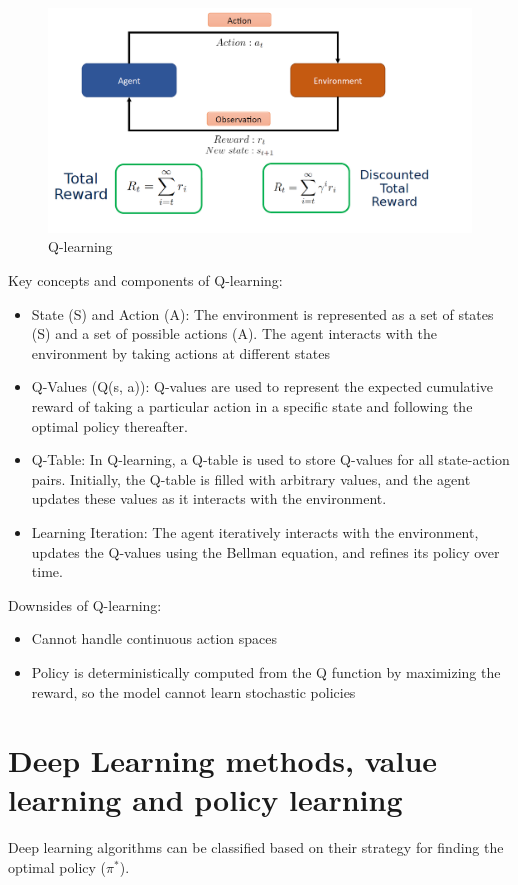 \documentclass[a4paper,12pt,answers]{article}
\begin{document}
	\begin{figure}[H]
		\centering
		\includegraphics[width=0.7\linewidth]{q_learning}
		\caption{Q-learning}
		\label{fig:qlearning}
	\end{figure}
	\noindent
	Key concepts and components of Q-learning:
	\begin{itemize}
		\item State (S) and Action (A): The environment is represented as a set of states (S) and a set of possible actions (A). The agent interacts with the environment by taking actions at different states
		\item Q-Values (Q(s, a)): Q-values are used to represent the expected cumulative reward of taking a particular action in a specific state and following the optimal policy thereafter.
		\item Q-Table: In Q-learning, a Q-table is used to store Q-values for all state-action pairs. Initially, the Q-table is filled with arbitrary values, and the agent updates these values as it interacts with the environment.
		\item Learning Iteration: The agent iteratively interacts with the environment, updates the Q-values using the Bellman equation, and refines its policy over time.
	\end{itemize}
	\noindent
	Downsides of Q-learning:
	\begin{itemize}
		\item Cannot handle continuous action spaces
		\item Policy is deterministically computed from the Q function by maximizing the reward, so the model cannot learn stochastic policies
	\end{itemize}
	
	
	
	\newpage
	\section{Deep Learning methods, value learning and policy learning}
	Deep learning algorithms can be classified based on their strategy for finding the optimal policy ($\pi^*$).
	
\end{document}
